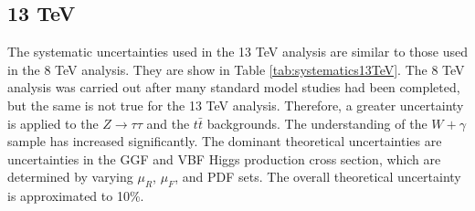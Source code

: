 \documentclass[oneside, letterpaper, oldfontcommands]{memoir}
\begin{document}
\subsection{13 TeV}
\qquad The systematic uncertainties used in the 13 TeV analysis are similar to those used in the 8 TeV analysis. They are show in Table \ref{tab:systematics13TeV}. The 8 TeV analysis was carried out after many standard model studies had been completed, but the same is not true for the 13 TeV analysis. Therefore, a greater uncertainty is applied to the $Z \rightarrow \tau\tau$ and the $t\bar{t}$ backgrounds. The understanding of the $W+\gamma$ sample has increased significantly. The dominant theoretical uncertainties are  uncertainties in the GGF and VBF Higgs production cross section, which are determined by varying $\mu_{R}$, $\mu_{F}$, and PDF sets. The overall theoretical uncertainty is approximated to 10\%. 
\end{document}
